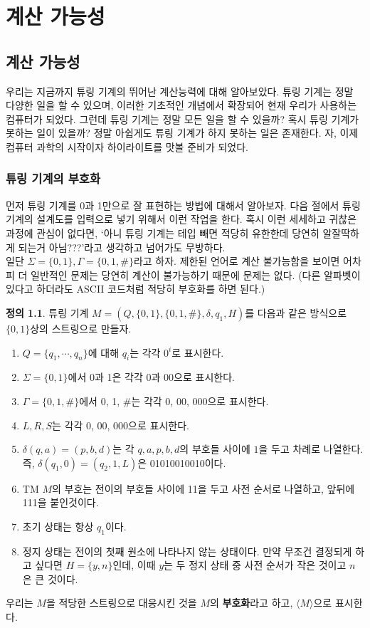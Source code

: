 \documentclass[b5paper, 10pt]{book}
\theoremstyle{definition}
\newtheorem{defn}{정의}[chapter]
\begin{document}
\part{계산 가능성}
\chapter{계산 가능성}
우리는 지금까지 튜링 기계의 뛰어난 계산능력에 대해 알아보았다. 튜링 기계는 정말 다양한 일을 할 수 있으며,
이러한 기초적인 개념에서 확장되어 현재 우리가 사용하는 컴퓨터가 되었다. 그런데 튜링 기계는 정말 모든 일을
할 수 있을까? 혹시 튜링 기계가 못하는 일이 있을까? 정말 아쉽게도 튜링 기계가 하지 못하는 일은 존재한다.
자, 이제 컴퓨터 과학의 시작이자 하이라이트를 맛볼 준비가 되었다.
\section{튜링 기계의 부호화}
먼저 튜링 기계를 0과 1만으로 잘 표현하는 방법에 대해서 알아보자. 다음 절에서 튜링 기계의 설계도를 
입력으로 넣기 위해서 이런 작업을 한다. 혹시 이런 세세하고 귀찮은 과정에 관심이 없다면, `아니 튜링 기계는
테입 빼면 적당히 유한한데 당연히 알잘딱하게 되는거 아님???'라고 생각하고 넘어가도 무방하다.\\ 
일단 $\Sigma = \{0, 1\}, \Gamma = \{0, 1, \#\}$라고 하자. 제한된 언어로 계산 불가능함을 보이면
어차피 더 일반적인 문제는 당연히 계산이 불가능하기 때문에 문제는 없다. (다른 알파벳이 있다고 하더라도 ASCII 코드처럼 
적당히 부호화를 하면 된다.) \\ 
\begin{defn} \label{TM encoding}
    튜링 기계 $M = (Q, \{0,1\}, \{0, 1, \#\}, \delta, q_1, H)$를 다음과 같은 방식으로
    $\{0,1\}$상의 스트링으로 만들자.
    \begin{enumerate}
        \item $Q = \{q_1, \cdots, q_n\}$에 대해 $q_i$는 각각 $0^i$로 표시한다. 
        \item $\Sigma = \{0,1\}$에서 0과 1은 각각 0과 00으로 표시한다. 
        \item $\Gamma = \{0,1,\#\}$에서 0, 1, \#는 각각 0, 00, 000으로 표시한다.
        \item $L, R, S$는 각각 0, 00, 000으로 표시한다.
        \item $\delta(q,a) = (p, b, d)$는 각 $q,a,p,b,d$의 부호들 사이에 $1$을 두고
        차례로 나열한다. 즉, $\delta(q_1, 0) = (q_2, 1, L)$은 01010010010이다. 
        \item TM $M$의 부호는 전이의 부호들 사이에 11을 두고 사전 순서로 나열하고, 
        앞뒤에 111을 붙인것이다. 
        \item 초기 상태는 항상 $q_1$이다. 
        \item 정지 상태는 전이의 첫째 원소에 나타나지 않는 상태이다. 만약 무조건
        결정되게 하고 싶다면 $H = \{y, n\}$인데, 이때 $y$는 두 정지 상태 중 
        사전 순서가 작은 것이고 $n$은 큰 것이다.
    \end{enumerate}
    우리는 $M$을 적당한 스트링으로 대응시킨 것을 $M$의 \textbf{부호화}라고 하고, $\langle M \rangle$으로 
    표시한다.
\end{defn}
\end{document}
